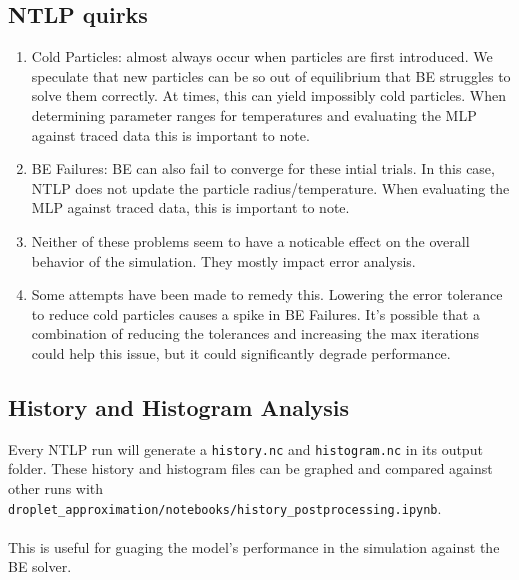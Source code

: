 \documentclass{article}
\begin{document}
\subsection{NTLP quirks}
\begin{enumerate}
	\item Cold Particles: almost always occur when particles are first introduced. We speculate that new particles can be so out of equilibrium that BE struggles to solve them correctly. At times, this can yield impossibly cold particles. When determining parameter ranges for temperatures and evaluating the MLP against traced data this is important to note.
	\item BE Failures: BE can also fail to converge for these intial trials. In this case, NTLP does not update the particle radius/temperature. When evaluating the MLP against traced data, this is important to note.
	\item Neither of these problems seem to have a noticable effect on the overall behavior of the simulation. They mostly impact error analysis.
	\item Some attempts have been made to remedy this. Lowering the error tolerance to reduce cold particles causes a spike in BE Failures. It's possible that a combination of reducing the tolerances and increasing the max iterations could help this issue, but it could significantly degrade performance. 
\end{enumerate}
\subsection{History and Histogram Analysis}
Every NTLP run will generate a \lstinline{history.nc} and \lstinline{histogram.nc} in its output folder. These history and histogram files can be graphed and compared against other runs with \\
\lstinline{droplet_approximation/notebooks/history_postprocessing.ipynb}.\\\\
This is useful for guaging the model's performance in the simulation against the BE solver.
\end{document}
